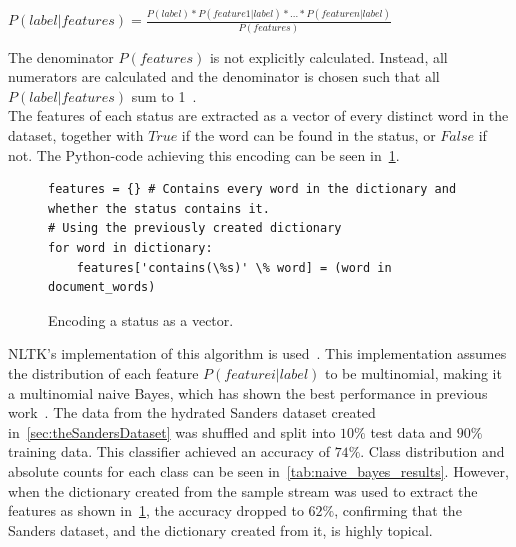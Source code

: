 \begin{math}
    P(label|features) = \frac{P(label)*P(feature 1|label)*...*P(feature n|label)}{P(features)}
\end{math}


The denominator $P(features)$ is not explicitly calculated.
Instead, all numerators are calculated and the denominator is chosen such that all $P(label|features)$ sum to 1~\cite{nltkDocs}.
\\
The features of each status are extracted as a vector of every distinct word in the dataset,
together with $True$ if the word can be found in the status, or $False$ if not.
The Python-code achieving this encoding can be seen in~\ref{code:extract_features}.

\begin{figure}
    \caption{Encoding a status as a vector.}
    \label{code:extract_features}
    \begin{verbatim}
features = {} # Contains every word in the dictionary and whether the status contains it.
# Using the previously created dictionary
for word in dictionary:
    features['contains(\%s)' \% word] = (word in document_words)
    \end{verbatim}
\end{figure}

NLTK's implementation of this algorithm is used~\cite{nltkDocs}.
This implementation assumes the distribution of each feature $P(feature i|label)$ to be multinomial,
making it a multinomial naive Bayes, which has shown the best performance in previous work~\cite{Go2009}.
The data from the hydrated Sanders dataset created in~\ref{sec:theSandersDataset} was shuffled and split into $10\%$ test data and $90\%$ training data.
This classifier achieved an accuracy of $74\%$.
Class distribution and absolute counts for each class can be seen in~\ref{tab:naive_bayes_results}.
However, when the dictionary created from the sample stream was used to extract the features as shown in~\ref{code:extract_features},
the accuracy dropped to $62\%$, confirming that the Sanders dataset, and the dictionary created from it, is highly topical.

\begin{table}
    \caption{Sentiment classification using multinomial naive Bayes}
    \label{tab:naive_bayes_results}
\end{table}


